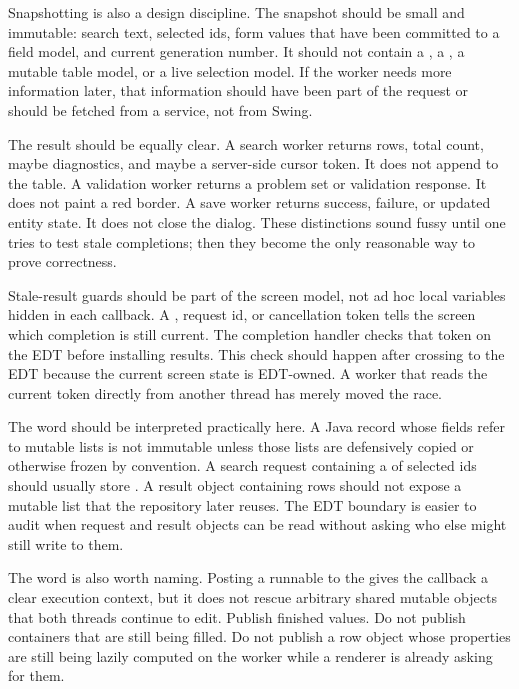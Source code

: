 Snapshotting is also a design discipline. The snapshot should be small and immutable: search text, selected ids, form values that have been committed to a field model, and current generation number. It should not contain a , a , a mutable table model, or a live selection model. If the worker needs more information later, that information should have been part of the request or should be fetched from a service, not from Swing.

The result should be equally clear. A search worker returns rows, total count, maybe diagnostics, and maybe a server-side cursor token. It does not append to the table. A validation worker returns a problem set or validation response. It does not paint a red border. A save worker returns success, failure, or updated entity state. It does not close the dialog. These distinctions sound fussy until one tries to test stale completions; then they become the only reasonable way to prove correctness.

Stale-result guards should be part of the screen model, not ad hoc local variables hidden in each callback. A , request id, or cancellation token tells the screen which completion is still current. The completion handler checks that token on the EDT before installing results. This check should happen after crossing to the EDT because the current screen state is EDT-owned. A worker that reads the current token directly from another thread has merely moved the race.

The word  should be interpreted practically here. A Java record whose fields refer to mutable lists is not immutable unless those lists are defensively copied or otherwise frozen by convention. A search request containing a  of selected ids should usually store . A result object containing rows should not expose a mutable list that the repository later reuses. The EDT boundary is easier to audit when request and result objects can be read without asking who else might still write to them.

The word  is also worth naming. Posting a runnable to the  gives the callback a clear execution context, but it does not rescue arbitrary shared mutable objects that both threads continue to edit. Publish finished values. Do not publish containers that are still being filled. Do not publish a row object whose properties are still being lazily computed on the worker while a renderer is already asking for them.

